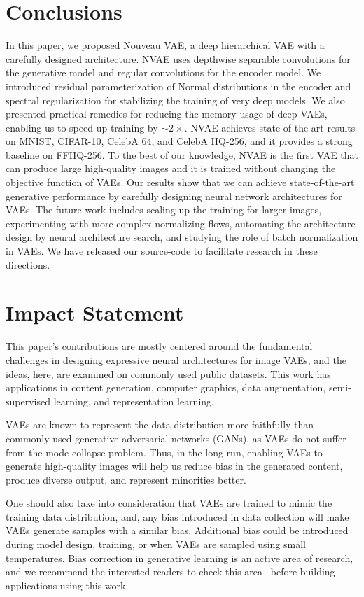 \documentclass{article}
\begin{document}
 \section{Conclusions}
\vspace{-0.2cm}
In this paper, we proposed Nouveau VAE, a deep hierarchical VAE with a carefully designed architecture. NVAE uses depthwise separable convolutions for the generative model and regular convolutions for the encoder model. We introduced residual parameterization of Normal distributions in the encoder and spectral regularization for stabilizing the training of very deep models. We also presented practical remedies for reducing the memory usage of deep VAEs, enabling us to speed up training by $\sim\!2\times$. NVAE achieves state-of-the-art results on MNIST, CIFAR-10, CelebA 64, and CelebA HQ-256, and it provides a strong baseline on FFHQ-256. To the best of our knowledge, NVAE is the first VAE that can produce large high-quality images and it is trained without changing the objective function of VAEs. Our results show that we can achieve state-of-the-art generative performance by carefully designing neural network architectures for VAEs. The future work includes scaling up the training for larger images, experimenting with more complex normalizing flows, automating the architecture design by neural architecture search, and studying the role of batch normalization in VAEs. We have released our source-code to facilitate research in these directions. \section*{Impact Statement}

This paper's contributions are mostly centered around the fundamental challenges in designing expressive neural architectures for image VAEs, and the ideas, here, are examined on commonly used public datasets. This work has applications in content generation, computer graphics, data augmentation, semi-supervised learning, and representation learning.

VAEs are known to represent the data distribution more faithfully than commonly used generative adversarial networks (GANs), as VAEs do not suffer from the mode collapse problem. Thus, in the long run, enabling VAEs to generate high-quality images will help us reduce bias in the generated content, produce diverse output, and represent minorities better.

One should also take into consideration that VAEs are trained to mimic the training data distribution, and, any bias introduced in data collection will make VAEs generate samples with a similar bias. Additional bias could be introduced during model design, training, or when VAEs are sampled using small temperatures. Bias correction in generative learning is an active area of research, and we recommend the interested readers to check this area~\cite{grover2019bias} before building applications using this work.
\end{document}
